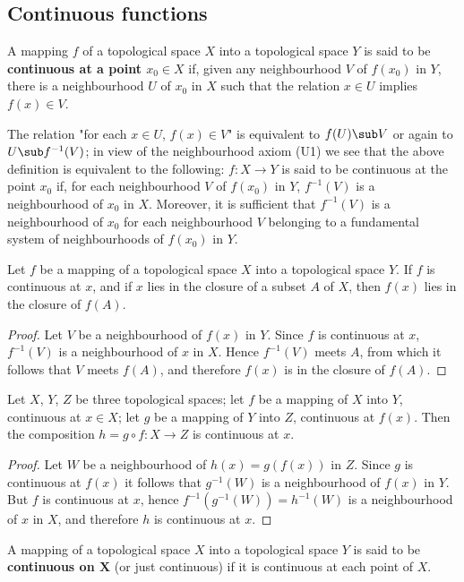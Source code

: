 \subsection{Continuous functions}
\begin{definition}
A mapping $f$ of a topological space $X$ into a topological space $Y$ is said to be \textbf{continuous at a point $x_0\in X$} if, given any neighbourhood $V$ of $f(x_0)$ in $Y$, there is a neighbourhood $U$ of $x_0$ in $X$ such that the relation $x\in U$ implies $f(x)\in V$.
\end{definition}
The relation "for each $x\in U$, $f(x)\in V$" is equivalent to $f(U)\sub V$ or again to $U\sub f^{-1}(V)$; in view of the neighbourhood axiom (U1) we see that the above definition is equivalent to the following: $f:X\to Y$ is said to be continuous at the point $x_0$ if, for each neighbourhood $V$ of $f(x_0)$ in $Y$, $f^{-1}(V)$ is a neighbourhood of $x_0$ in $X$. Moreover, it is sufficient that $f^{-1}(V)$ is a neighbourhood of $x_0$ for each neighbourhood $V$ belonging to a fundamental system of neighbourhoods of $f(x_0)$ in $Y$.
\begin{proposition}
Let $f$ be a mapping of a topological space $X$ into a topological space $Y$. If $f$ is continuous at $x$, and if $x$ lies in the closure of a subset $A$ of $X$, then $f(x)$ lies in the closure of $f(A)$.
\end{proposition}
\begin{proof}
Let $V$ be a neighbourhood of $f(x)$ in $Y$. Since $f$ is continuous at $x$, $f^{-1}(V)$ is a neighbourhood of $x$ in $X$. Hence $f^{-1}(V)$ meets $A$, from which it follows that $V$ meets $f(A)$, and therefore $f(x)$ is in the closure of $f(A)$.
\end{proof}
\begin{proposition}\label{continuous at a point composition}
Let $X$, $Y$, $Z$ be three topological spaces; let $f$ be a mapping of $X$ into $Y$, continuous at $x\in X$; let $g$ be a mapping of $Y$ into $Z$, continuous at $f(x)$. Then the composition $h=g\circ f:X\to Z$ is continuous at $x$.
\end{proposition}
\begin{proof}
Let $W$ be a neighbourhood of $h(x)=g(f(x))$ in $Z$. Since $g$ is continuous at $f(x)$ it follows that $g^{-1}(W)$ is a neighbourhood of $f(x)$ in $Y$. But $f$ is continuous at $x$, hence $f^{-1}(g^{-1}(W))=h^{-1}(W)$ is a neighbourhood of $x$ in $X$, and therefore $h$ is continuous at $x$.
\end{proof}
\begin{definition}
A mapping of a topological space $X$ into a topological space $Y$ is said to be \textbf{continuous on $\bm{X}$} (or just continuous) if it is continuous at each point of $X$.
\end{definition}
